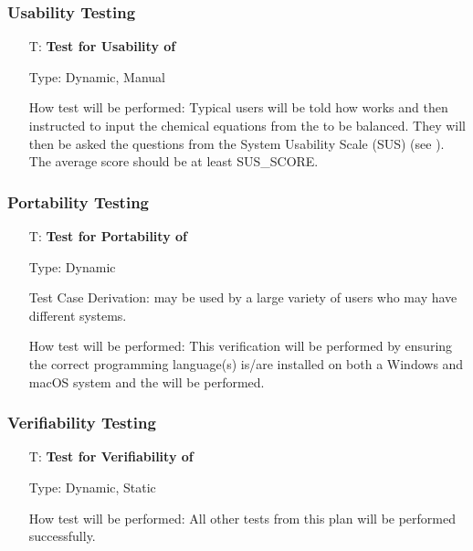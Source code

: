 \documentclass[12pt, titlepage]{article}
\newcounter{testnum} %
\begin{document}
\subsubsection{Usability Testing}

\begin{enumerate}

  \item[T\refstepcounter{testnum}\thetestnum \label{test_usable}:]
    \textbf{Test for Usability of \progname{}}

    Type: Dynamic, Manual

    How test will be performed: Typical users will be told how \progname{}
    works and then instructed to input the chemical equations from the
     to be balanced. They will then be asked the
    questions from the System Usability Scale (SUS) \cite{thomas_how_2015}
    (see ). The average score should be at least
    SUS\_SCORE.

\end{enumerate}

\subsubsection{Portability Testing}

\begin{enumerate}

  \item[T\refstepcounter{testnum}\thetestnum \label{test_portable}:]
    \textbf{Test for Portability of \progname{}}

    Type: Dynamic

    Test Case Derivation: \progname{} may be used by a large variety of users
    who may have different systems.

    How test will be performed: This verification will be performed by
    ensuring the correct programming language(s) is/are installed on both a
    Windows and macOS system and the  will be
    performed. %

\end{enumerate}

\subsubsection{Verifiability Testing}

\begin{enumerate}

  \item[T\refstepcounter{testnum}\thetestnum \label{test_verifiable}:]
    \textbf{Test for Verifiability of \progname{}}

    Type: Dynamic, Static

    How test will be performed: All other tests from this plan will be
    performed successfully.

\end{enumerate}
\end{document}

